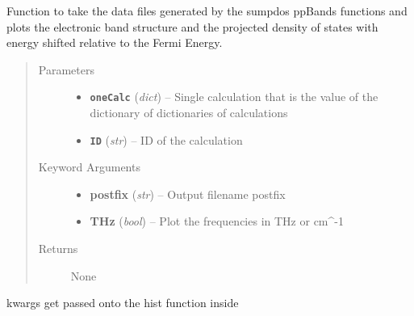 \documentclass[letterpaper,10pt,english]{sphinxmanual}
\begin{document}
\begin{fulllineitems}
\label{plot:plot.__plot_phonon}
Function to take the data files generated by the sumpdos ppBands functions and plots the electronic band structure and the projected density of states with energy shifted relative to the Fermi Energy.
\begin{quote}\begin{description}
\item[{Parameters}] \leavevmode\begin{itemize}
\item {} 
\textbf{\texttt{oneCalc}} (\emph{dict}) -- Single calculation that is the value of the dictionary of dictionaries of calculations

\item {} 
\textbf{\texttt{ID}} (\emph{str}) -- ID of the calculation

\end{itemize}

\item[{Keyword Arguments}] \leavevmode\begin{itemize}
\item {} 
\textbf{postfix} (\emph{str}) --
Output filename postfix

\item {} 
\textbf{THz} (\emph{bool}) --
Plot the frequencies in THz or cm\textasciicircum{}-1

\end{itemize}

\item[{Returns}] \leavevmode
None

\end{description}\end{quote}

\end{fulllineitems}


\begin{fulllineitems}
\label{plot:plot.__radialPDF}
kwargs get passed onto the hist function inside

\end{fulllineitems}
\end{document}
